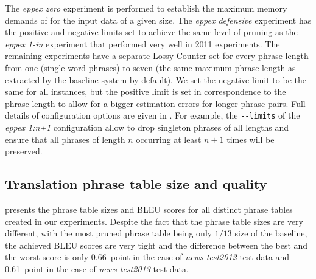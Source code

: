 The \emph{eppex zero} experiment is performed to establish the maximum memory demands of \eppex{}
for the input data of a given size.
The \emph{eppex defensive} experiment has the positive and negative limits set to achieve the same
level of pruning as the \emph{eppex 1-in} experiment that performed very well in 2011 experiments.
The remaining \eppex{} experiments have a separate Lossy Counter set for every phrase length
from one (single-word phrases) to seven (the same maximum phrase length as extracted by the baseline
system by default).
We set the negative limit to be the same for all instances, but the positive limit is set in correspondence
to the phrase length to allow for a bigger estimation errors for longer phrase pairs.
Full details of \eppex{} configuration options are given in .
For example, the \verb|--limits| of the \emph{eppex 1:n+1} configuration allow to drop singleton phrases
of all lengths and ensure that all phrases of length $n$ occurring at least $n+1$ times will be preserved.

\subsection{Translation phrase table size and quality}

 presents the phrase table sizes and BLEU scores for all
distinct phrase tables created in our experiments.
Despite the fact that the phrase table sizes are very different, with the most pruned phrase table being
only $1/13$ size of the baseline, the achieved BLEU scores are very tight and the difference
between the best and the worst score is only 0.66~point in the case of \emph{news-test2012} test data
and 0.61~point in the case of \emph{news-test2013} test data.

